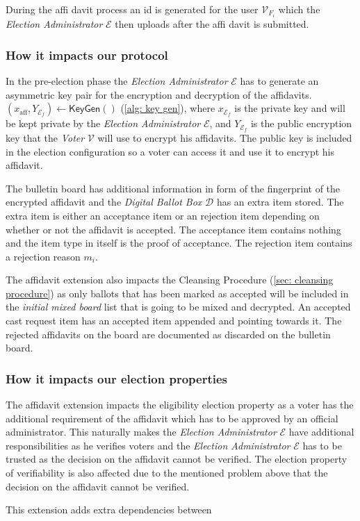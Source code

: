 During the affi davit process an id is generated for the user $\mathcal{V}_{{F}_i}$ which the \textit{Election Administrator} $\mathcal{E}$ then uploads after the affi davit is submitted.


\subsubsection{How it impacts our protocol}
In the pre-election phase the \textit{Election Administrator} $\mathcal{E}$ has to generate an asymmetric key pair for the encryption and decryption of the affidavits. $(x_\mathrm{aff}, Y_{\mathcal{E}_f}) \leftarrow \mathsf{KeyGen}()$ (\cref{alg: key gen}), where $x_{\mathcal{E}_f}$ is the private key and will be kept private by the \textit{Election Administrator} $\mathcal{E}$, and $Y_{\mathcal{E}_f}$ is the public encryption key that the \textit{Voter} $\mathcal{V}$ will use to encrypt his affidavits. The public key is included in the election configuration so a voter can access it and use it to encrypt his affidavit.

The bulletin board has additional information in form of the fingerprint of the encrypted affidavit and the \textit{Digital Ballot Box} $\mathcal{D}$ has an extra item stored. The extra item is either an acceptance item or an rejection item depending on whether or not the affidavit is accepted. The acceptance item contains nothing and the item type in itself is the proof of acceptance. The rejection item contains a rejection reason $m_i$. 

The affidavit extension also impacts the Cleansing Procedure (\cref{sec: cleansing procedure}) as only ballots that has been marked as accepted will be included in the \textit{initial mixed board} list that is going to be mixed and decrypted. An accepted cast request item has an accepted item appended and pointing towards it. The rejected affidavits on the board are documented as discarded on the bulletin board. 


\subsubsection{How it impacts our election properties}
The affidavit extension impacts the eligibility election property as a voter has the additional requirement of the affidavit which has to be approved by an official administrator. This naturally makes the \textit{Election Administrator} $\mathcal{E}$ have additional responsibilities as he verifies voters and the \textit{Election Administrator} $\mathcal{E}$ has to be trusted as the decision on the affidavit cannot be verified.
The election property of verifiability is also affected due to the mentioned problem above that the decision on the affidavit cannot be verified.

This extension adds extra dependencies between
